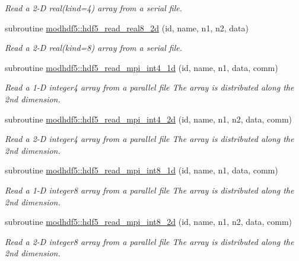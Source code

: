 \begin{DoxyCompactItemize}
\begin{DoxyCompactList}\small\item\em Read a 2-\/D real(kind=4) array from a serial file. \end{DoxyCompactList}\item 
subroutine \hyperlink{namespacemodhdf5_a7ba4b99f85945770344cdd73b713ea3a}{modhdf5\+::hdf5\+\_\+read\+\_\+real8\+\_\+2d} (id, name, n1, n2, data)
\begin{DoxyCompactList}\small\item\em Read a 2-\/D real(kind=8) array from a serial file. \end{DoxyCompactList}\item 
subroutine \hyperlink{namespacemodhdf5_a18b987f7a44198ccc7dd893cbdc322fc}{modhdf5\+::hdf5\+\_\+read\+\_\+mpi\+\_\+int4\+\_\+1d} (id, name, n1, data, comm)
\begin{DoxyCompactList}\small\item\em Read a 1-\/D integer4 array from a parallel file The array is distributed along the 2nd dimension. \end{DoxyCompactList}\item 
subroutine \hyperlink{namespacemodhdf5_ac96ae5057bcd6745840c716a232d4b66}{modhdf5\+::hdf5\+\_\+read\+\_\+mpi\+\_\+int4\+\_\+2d} (id, name, n1, n2, data, comm)
\begin{DoxyCompactList}\small\item\em Read a 2-\/D integer4 array from a parallel file The array is distributed along the 2nd dimension. \end{DoxyCompactList}\item 
subroutine \hyperlink{namespacemodhdf5_a2847f70176f88d95e8e6e1bec3a2539e}{modhdf5\+::hdf5\+\_\+read\+\_\+mpi\+\_\+int8\+\_\+1d} (id, name, n1, data, comm)
\begin{DoxyCompactList}\small\item\em Read a 1-\/D integer8 array from a parallel file The array is distributed along the 2nd dimension. \end{DoxyCompactList}\item 
subroutine \hyperlink{namespacemodhdf5_a41bc63b78ce861c9898ef45642514a9d}{modhdf5\+::hdf5\+\_\+read\+\_\+mpi\+\_\+int8\+\_\+2d} (id, name, n1, n2, data, comm)
\begin{DoxyCompactList}\small\item\em Read a 2-\/D integer8 array from a parallel file The array is distributed along the 2nd dimension. \end{DoxyCompactList}\item 

\end{DoxyCompactItemize}
